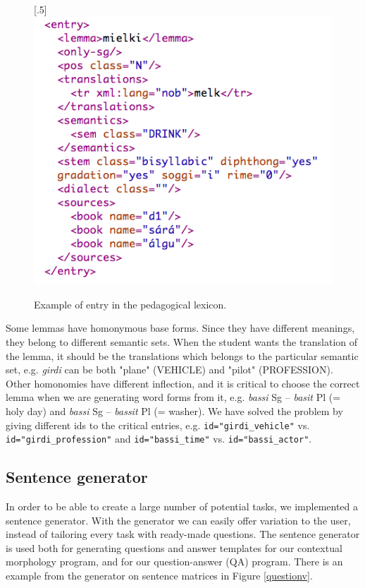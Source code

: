 \documentclass[11pt]{article}
\begin{document}
\begin{figure}[htbp]
\begin{center}
\scalebox{.5}[.5]{\includegraphics{presentation/img/nounlexicon.png}}\\
\caption{Example of entry in the pedagogical lexicon.}
\label{nounlex}
\end{center}
\end{figure}

Some lemmas have homonymous base forms. Since they have different meanings, they belong to different semantic sets. When the student wants the translation of the lemma, it should be the translations which belongs to the particular semantic set, e.g. \textit{girdi} can be both "plane" (VEHICLE) and "pilot" (PROFESSION). Other homonomies have different inflection, and it is critical to choose the correct lemma when we are generating word forms from it, e.g. \textit{bassi} Sg -- \textit{basit} Pl (= holy day) and \textit{bassi} Sg -- \textit{bassit} Pl (= washer). We have solved the problem by giving different ids to the critical entries, e.g. \texttt{id="girdi\_vehicle"} vs. 
\texttt{id="girdi\_profession"} and \texttt{id="bassi\_time"} vs. \texttt{id="bassi\_actor"}.


\subsection{Sentence generator}\label{set}
In order to be able to create a large number of potential tasks, we implemented a sentence generator. With the generator we can easily offer variation to the user, instead of tailoring every task with ready-made questions. The sentence generator is used both for generating questions and answer templates for our contextual morphology program, and for our question-answer (QA) program. There is an example from the generator on sentence matrices in Figure \ref{questionv}.
\end{document}
